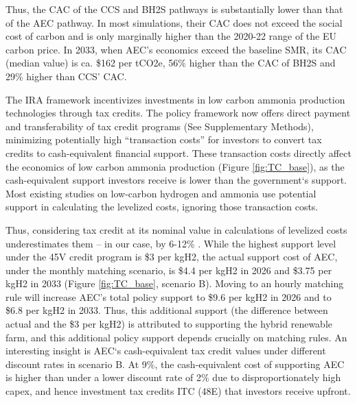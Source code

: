 \documentclass{article}
\begin{document}
Thus, the CAC of the CCS and BH2S pathways is substantially lower than that of the AEC pathway. In most simulations, their CAC does not exceed the social cost of carbon and is only marginally higher than the 2020-22 range of the EU carbon price. In 2033, when AEC’s economics exceed the baseline SMR, its CAC (median value) is ca. \$162 per tCO2e, 56\% higher than the CAC of BH2S and 29\% higher than CCS’ CAC.

The IRA framework incentivizes investments in low carbon ammonia production technologies through tax credits. The policy framework now offers direct payment and transferability of tax credit programs (See Supplementary Methods), minimizing potentially high “transaction costs” for investors to convert tax credits to cash-equivalent financial support. These transaction costs directly affect the economics of low carbon ammonia production (Figure \ref{fig:TC_base}), as the cash-equivalent support investors receive is lower than the government‘s support. Most existing studies \cite{Jenkins2023, Cheng2023} on low-carbon hydrogen and ammonia use potential support in calculating the levelized costs, ignoring those transaction costs.

Thus, considering tax credit at its nominal value in calculations of levelized costs underestimates them – in our case, by 6-12\% . While the highest support level under the 45V credit program is \$3 per kgH2, the actual support cost of AEC, under the monthly matching scenario, is  \$4.4 per kgH2 in 2026 and \$3.75 per kgH2 in 2033 (Figure \ref{fig:TC_base}, scenario B). Moving to an hourly matching rule will increase AEC’s total policy support to \$9.6 per kgH2 in 2026 and to \$6.8 per kgH2 in 2033. Thus, this additional support (the difference between actual and the \$3 per kgH2) is attributed to supporting the hybrid renewable farm, and this additional policy support depends crucially on matching rules. An interesting insight is AEC‘s cash-equivalent tax credit values under different discount rates in scenario B. At 9\%, the cash-equivalent cost of supporting AEC is higher than under a lower discount rate of 2\% due to disproportionately high capex, and hence investment tax credits ITC (48E) that investors receive upfront.
\end{document}
